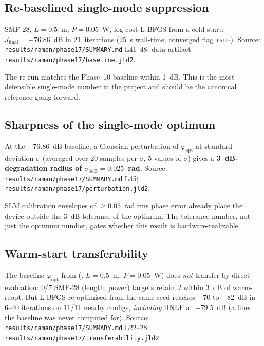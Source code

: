 \documentclass[12pt,a4paper]{article}
\theoremstyle{definition}
\begin{document}
\subsection{Re-baselined single-mode suppression}
\label{sec:april-rebaseline}

\begin{keyresult}
SMF-28, $L = 0.5$~m, $P = 0.05$~W, log-cost L-BFGS from a cold
start: $J_\text{final} = -76.86$~dB in 21~iterations (25~s wall-time,
converged flag \textsc{true}). Source:
\texttt{results/raman/phase17/SUMMARY.md} L41--48;
data artifact \texttt{results/raman/phase17/baseline.jld2}.
\end{keyresult}

The re-run matches the Phase~10 baseline within 1~dB. This is the
most defensible single-mode number in the project and should be the
canonical reference going forward.

\subsection{Sharpness of the single-mode optimum}
\label{sec:april-sigma3db}

At the $-76.86$~dB baseline, a Gaussian perturbation of
$\varphi_\text{opt}$ at standard deviation $\sigma$ (averaged over 20
samples per $\sigma$, 5 values of $\sigma$) gives a
\textbf{3~dB-degradation radius of $\sigma_{3\text{dB}} = 0.025$~rad}.
Source: \texttt{results/raman/phase17/SUMMARY.md} L45;
\texttt{results/raman/phase17/perturbation.jld2}.

\begin{advisory}
SLM calibration envelopes of $\geq 0.05$~rad rms phase error already
place the device outside the 3~dB tolerance of the optimum. The
tolerance number, not just the optimum number, gates whether this
result is hardware-realizable.
\end{advisory}

\subsection{Warm-start transferability}
\label{sec:april-warmstart}

The baseline $\varphi_\text{opt}$ from
(, $L=0.5$~m, $P=0.05$~W) does \emph{not} transfer by
direct evaluation: 0/7 SMF-28 (length, power) targets retain
$J$ within 3~dB of warm-reopt. But L-BFGS re-optimised from the
same seed reaches $-70$ to $-82$~dB in 6--40 iterations on 11/11
nearby configs, \emph{including} HNLF at $-79.5$~dB (a fiber the
baseline was never computed for). Source:
\texttt{results/raman/phase17/SUMMARY.md} L22--28;
\texttt{results/raman/phase17/transferability.jld2}.
\end{document}
